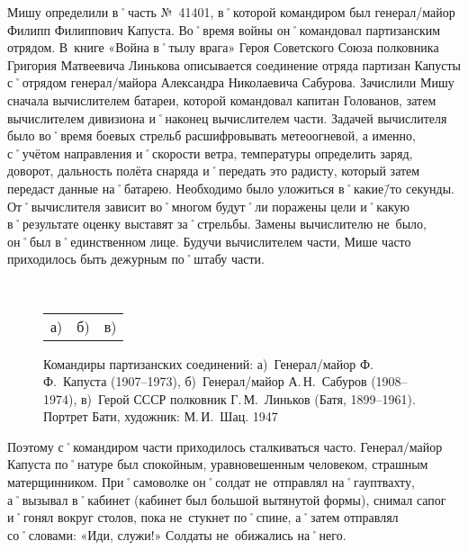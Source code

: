 Мишу определили в˚часть №~41401, в˚которой командиром был генерал\-/майор Филипп Филиппович Капуста. Во˚время войны он˚командовал партизанским отрядом. В~книге «Война в˚тылу врага» Героя Советского Союза полковника Григория Матвеевича Линькова описывается соединение отряда партизан Капусты с˚отрядом генерал\-/майора Александра Николаевича Сабурова. Зачислили Мишу сначала вычислителем батареи, которой командовал капитан Голованов, затем вычислителем дивизиона и˚наконец вычислителем части. Задачей вычислителя было во˚время боевых стрельб расшифровывать метеоогневой, а именно, с˚учётом направления и˚скорости ветра, температуры определить заряд, доворот, дальность полёта снаряда и˚передать это радисту, который затем передаст данные на˚батарею. Необходимо было уложиться в˚какие\=/то секунды. От˚вычислителя зависит во˚многом будут˚ли поражены цели и˚какую в˚результате оценку выставят за˚стрельбы. Замены вычислителю не~было, он˚был в˚единственном лице. Будучи вычислителем части, Мише часто приходилось быть дежурным по˚штабу части. 

\begin{figure}[h]
	\hfil	
	\begin{minipage}[b]{0.32\linewidth}			
	\end{minipage}	
	\hfil	
	\begin{minipage}[b]{0.32\linewidth}	
	\end{minipage}	
	\hfil	
	\begin{minipage}[b]{0.32\linewidth}		
	\end{minipage}	
	\hfil
	\\[1ex]	
	\begin{minipage}[b]{.96\linewidth}
		\begin{tabular}{p{.32\linewidth}p{.32\linewidth}p{.32\linewidth}}
			\centering а) & \centering б) & \centering в) 
		\end{tabular}
	\end{minipage}	
	\captionsetup{skip=1ex}							%
	\caption{Командиры партизанских соединений: 
	а)~Генерал\-/майор Ф.\,Ф.~Капуста (1907–1973), 
	б)~Генерал\-/майор А.\,Н.~Сабуров (1908–1974), 
	в)~Герой СССР полковник Г.\,М.~Линьков (Батя, 1899–1961). Портрет Бати, художник: М.\,И.~Шац. 1947}
\end{figure}

Поэтому с˚командиром части приходилось сталкиваться часто. Генерал\-/майор Капуста по˚натуре был спокойным, уравновешенным человеком, страшным матерщинником. При˚самоволке он˚солдат не~отправлял на˚гауптвахту, а˚вызывал в˚кабинет (кабинет был большой вытянутой формы), снимал сапог и˚гонял вокруг столов, пока не~стукнет по˚спине, а˚затем отправлял со˚словами: «Иди, служи!» Солдаты не~обижались на˚него.

